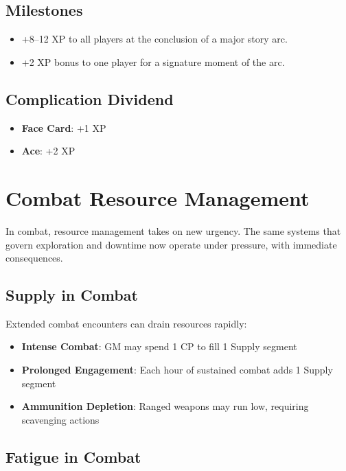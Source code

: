 \subsection*{Milestones}

\begin{itemize}
    \item +8–12 XP to all players at the conclusion of a major story arc.
    \item +2 XP bonus to one player for a signature moment of the arc.
\end{itemize}

\subsection*{Complication Dividend}

\begin{itemize}
    \item \textbf{Face Card}: +1 XP
    \item \textbf{Ace}: +2 XP
\end{itemize}

\section*{Combat Resource Management}

In combat, resource management takes on new urgency. The same systems that govern exploration and downtime now operate under pressure, with immediate consequences.

\subsection*{Supply in Combat}

Extended combat encounters can drain resources rapidly:

\begin{itemize}
    \item \textbf{Intense Combat}: GM may spend 1 CP to fill 1 Supply segment
    \item \textbf{Prolonged Engagement}: Each hour of sustained combat adds 1 Supply segment
    \item \textbf{Ammunition Depletion}: Ranged weapons may run low, requiring scavenging actions
\end{itemize}

\subsection*{Fatigue in Combat}

